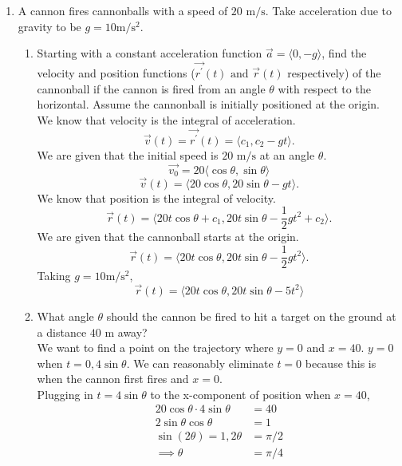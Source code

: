 \begin{enumerate}
	\item A cannon fires cannonballs with a speed of $20 \text{ m} / \text{s}$. Take acceleration due to gravity to be $g = 10 \text{m} / \text{s}^2$.
	\begin{enumerate}[label=\alph*.]
		\item Starting with a constant acceleration function $\vec{a} = \langle 0, -g \rangle$, find the velocity and position functions ($\vec{r^\prime}(t) \text{ and } \vec{r}(t)$ respectively) of the cannonball if the cannon is fired from an angle $\theta$ with respect to the horizontal. Assume the cannonball is initially positioned at the origin.\\
		We know that velocity is the integral of acceleration.
		\begin{equation*}
			\vec{v}(t) = \vec{r^\prime}(t) = \langle c_1, c_2-gt \rangle.
		\end{equation*}
		We are given that the initial speed is $20 \text{ m} / \text{s}$ at an angle $\theta$.
		\begin{equation*}
			\vec{v_0} = 20\langle \cos{\theta}, \sin{\theta} \rangle
		\end{equation*}
		\begin{equation*}
			\vec{v}(t) = \langle 20\cos{\theta}, 20\sin{\theta}-gt \rangle.
		\end{equation*}
		We know that position is the integral of velocity.
		\begin{equation*}
			\vec{r}(t) = \langle 20t\cos{\theta} + c_1, 20t\sin{\theta} - \frac{1}{2}gt^2 + c_2 \rangle.
		\end{equation*}
		We are given that the cannonball starts at the origin.
		\begin{equation*}
			\vec{r}(t) = \langle 20t\cos{\theta}, 20t\sin{\theta} - \frac{1}{2}gt^2 \rangle.
		\end{equation*}
		Taking $g = 10 \text{m} / \text{s}^2$,\\
		\begin{equation*}
			\vec{r}(t) = \langle 20t\cos{\theta}, 20t\sin{\theta}-5t^2 \rangle
		\end{equation*}
			
		\item What angle $\theta$ should the cannon be fired to hit a target on the ground at a distance $40\text{ m}$ away?\\
		We want to find a point on the trajectory where $y = 0$ and $x = 40$.
		$y = 0$ when $t = 0, 4\sin{\theta}$. We can reasonably eliminate $t = 0$ because this is when the cannon first fires and $x = 0$.\\
		Plugging in $t = 4\sin{\theta}$ to the x-component of position when $x = 40$,
		\begin{align*}
			20\cos{\theta} \cdot 4\sin{\theta} &= 40 \\
			2\sin{\theta}\cos{\theta} &= 1 \\
			\sin{(2\theta)}=1, 2\theta &= \pi/2 \\
			\implies \theta &= \pi/4
		\end{align*}
	\end{enumerate}
	

\end{enumerate}
